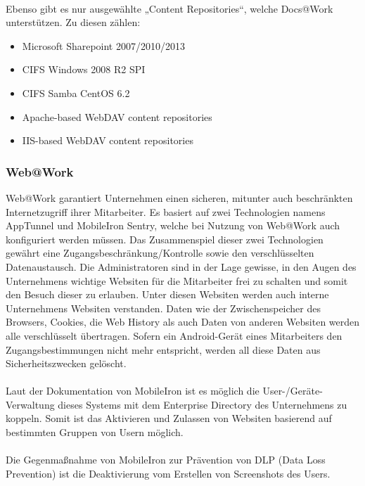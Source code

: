 \paragraph*{}
Ebenso gibt es nur ausgewählte „Content Repositories“, welche Docs@Work unterstützen. Zu diesen zählen:
\begin{itemize}
	\item Microsoft Sharepoint 2007/2010/2013
	\item CIFS Windows 2008 R2 SPI
	\item CIFS Samba CentOS 6.2
	\item Apache-based WebDAV content repositories
	\item IIS-based WebDAV content repositories
\end{itemize}

\subsubsection{Web@Work}
Web@Work garantiert Unternehmen einen sicheren, mitunter auch beschränkten Internetzugriff ihrer Mitarbeiter. Es basiert auf zwei Technologien namens AppTunnel und MobileIron Sentry, welche bei Nutzung von Web@Work auch konfiguriert werden müssen. Das Zusammenspiel dieser zwei Technologien gewährt eine Zugangsbeschränkung/Kontrolle sowie den verschlüsselten Datenaustausch. Die Administratoren sind in der Lage gewisse, in den Augen des Unternehmens wichtige Websiten für die Mitarbeiter frei zu schalten und somit den Besuch dieser zu erlauben. Unter diesen Websiten werden auch interne Unternehmens Websiten verstanden. Daten wie der Zwischenspeicher des Browsers, Cookies, die Web History als auch Daten von anderen Websiten werden alle verschlüsselt übertragen. Sofern ein Android-Gerät eines Mitarbeiters den Zugangsbestimmungen nicht mehr entspricht, werden all diese Daten aus Sicherheitszwecken gelöscht.
\paragraph*{}
Laut der Dokumentation von MobileIron ist es möglich die User-/Geräte-Verwaltung dieses Systems mit dem Enterprise Directory des Unternehmens zu koppeln. Somit ist das Aktivieren und Zulassen von Websiten basierend auf bestimmten Gruppen von Usern möglich.
\paragraph*{}
Die Gegenmaßnahme von MobileIron zur Prävention von DLP (Data Loss Prevention) ist die Deaktivierung vom Erstellen von Screenshots des Users.
